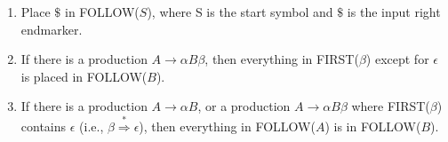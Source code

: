 \documentclass[oneside]{article}
\begin{document}
\begin{enumerate}

\item{Place $\$$ in FOLLOW($S$), where S is the start symbol and $\$$ is the
input right endmarker.}

\item{If there is a production $A\rightarrow \alpha B\beta$, then everything
in FIRST($\beta$) except for $\epsilon$ is placed in FOLLOW($B$).}

\item{If there is a production $A\rightarrow \alpha B$, or a production
$A\rightarrow \alpha B\beta$ where FIRST($\beta$) contains $\epsilon$ (i.e.,
$\beta\stackrel{*}\Rightarrow\epsilon$), then everything in FOLLOW($A$) is
in FOLLOW($B$).}

\end{enumerate}
\end{document}
